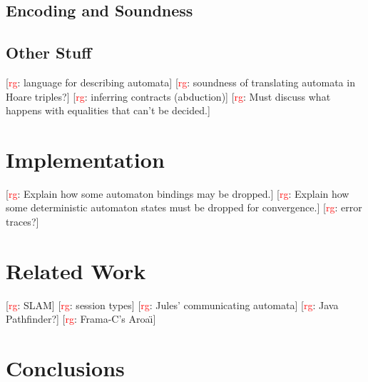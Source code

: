 \documentclass[a4paper]{article}
\newcommand{\todo}[2]{{\small [\textcolor{red}{#1}: #2]}}
\newcommand{\rg}[1]{\todo{rg}{#1}}
\theoremstyle{remark}
\begin{document}

\subsection{Encoding and Soundness} %


\subsection{Other Stuff} %

\rg{language for describing automata}
\rg{soundness of translating automata in Hoare triples?}
\rg{inferring contracts (abduction)}
\rg{Must discuss what happens with equalities that can't be decided.}

\section{Implementation} %

\rg{Explain how some automaton bindings may be dropped.}
\rg{Explain how some deterministic automaton states must be dropped for convergence.}
\rg{error traces?}

\section{Related Work} %

\rg{SLAM}
\rg{session types}
\rg{Jules' communicating automata}
\rg{Java Pathfinder?}
\rg{Frama-C's Aroa\"\i}

\section{Conclusions} %



\end{document}
